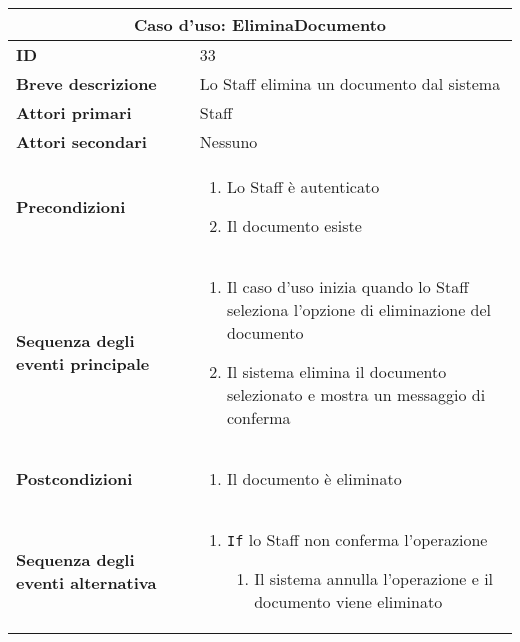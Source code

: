 \documentclass[a4paper]{report}
\begin{document}
\clearpage
\begin{table}[H]
\vspace*{-0cm}
\renewcommand{\arraystretch}{1.9}
\begin{tabular}{|p{3.9cm}|p{9.9cm}|}
\hline
\multicolumn{2}{|c|}{\textbf{Caso d’uso: EliminaDocumento}} \\ \hline
	\textbf{ID} & 33 \\ \hline
	\textbf{Breve descrizione} & Lo Staff elimina un documento dal sistema \\ \hline
	\textbf{Attori primari} & Staff \\ \hline
	\textbf{Attori secondari} & Nessuno \\ \hline
	\textbf{Precondizioni} & \begin{enumerate}[leftmargin=14pt,label=\arabic*.,labelsep=0.5em,topsep=0pt,partopsep=0pt,parsep=0pt,itemsep=0pt]
        \item Lo Staff è autenticato
        \item Il documento esiste
    \end{enumerate} \\ \hline
	\textbf{Sequenza degli eventi principale} & 
\begin{enumerate}[leftmargin=14pt,label=\arabic*.,labelsep=0.5em,topsep=0pt,partopsep=0pt,parsep=0pt,itemsep=0pt]
    \item Il caso d’uso inizia quando lo Staff seleziona l'opzione di eliminazione del documento
    \item Il sistema elimina il documento selezionato e mostra un messaggio di conferma
\end{enumerate}\\ \hline
	\textbf{Postcondizioni} & \begin{enumerate}[leftmargin=14pt,label=\arabic*.,labelsep=0.5em,topsep=0pt,partopsep=0pt,parsep=0pt,itemsep=0pt]
        \item Il documento è eliminato
    \end{enumerate}\\ \hline
	\textbf{Sequenza degli eventi alternativa} & 
\begin{enumerate}[leftmargin=14pt,label=\arabic*.,labelsep=0.5em,topsep=0pt,partopsep=0pt,parsep=0pt,itemsep=0pt]
    \item \texttt{If} lo Staff non conferma l’operazione
    \begin{enumerate}[label=\arabic{enumi}.\arabic*.,leftmargin=22pt,labelsep=0.5em,topsep=0pt,partopsep=0pt,parsep=0pt,itemsep=0pt]
        \item Il sistema annulla l’operazione e il documento viene eliminato
    \end{enumerate}
\end{enumerate} \\ \hline
\end{tabular}
\end{table}
\end{document}
